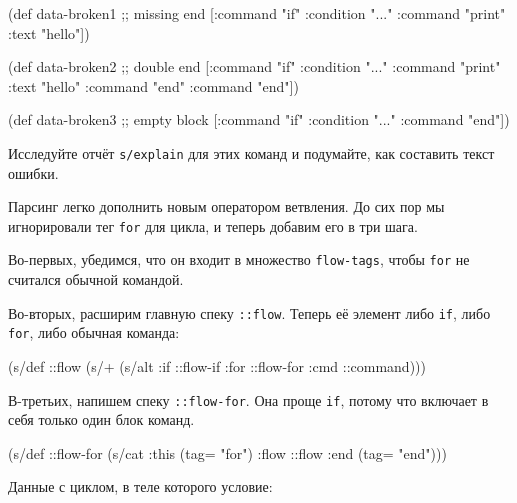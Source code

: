 \begin{english}
  \begin{clojure}
(def data-broken1 ;; missing end
  [{:command "if" :condition "..."}
   {:command "print" :text "hello"}])

(def data-broken2 ;; double end
  [{:command "if" :condition "..."}
   {:command "print" :text "hello"}
   {:command "end"}
   {:command "end"}])

(def data-broken3 ;; empty block
  [{:command "if" :condition "..."}
   {:command "end"}])
  \end{clojure}
\end{english}

Исследуйте отчёт \verb|s/explain| для этих команд и подумайте, как составить
текст ошибки.

Парсинг легко дополнить новым оператором ветвления. До сих пор мы игнорировали
тег \verb|for| для цикла, и теперь добавим его в три шага.

Во-первых, убедимся, что он входит в множество \texttt{flow-tags}, чтобы
\verb|for| не считался обычной командой.

Во-вторых, расширим главную спеку \texttt{::flow}. Теперь её элемент либо
\texttt{if}, либо \texttt{for}, либо обычная команда:

\begin{english}
  \begin{clojure}
(s/def ::flow
  (s/+
   (s/alt :if ::flow-if
          :for ::flow-for
          :cmd ::command)))
  \end{clojure}
\end{english}

В-третьих, напишем спеку \texttt{::flow-for}. Она проще \texttt{if}, потому что
включает в себя только один блок команд.

\begin{english}
  \begin{clojure}
(s/def ::flow-for
  (s/cat :this (tag= "for")
         :flow ::flow
         :end (tag= "end")))
  \end{clojure}
\end{english}

Данные с циклом, в теле которого условие:

\begin{english}
  \begin{clojure}
  \end{clojure}
\end{english}

